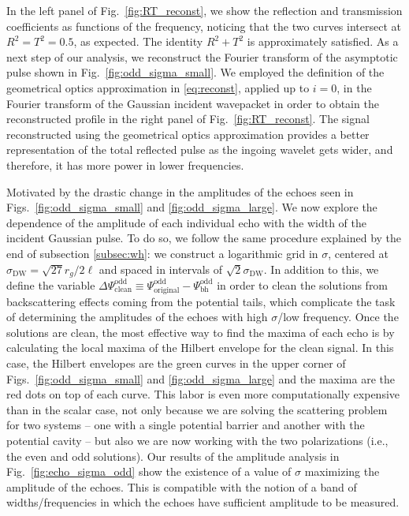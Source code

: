 \documentclass[article,aps,nofootinbib,twocolumn,superscriptaddress]{revtex4-1}
\begin{document}
In the left panel of Fig.~\ref{fig:RT_reconst}, we show the reflection and transmission coefficients as functions of the frequency, noticing that the two curves intersect at $R^2=T^2=0.5$, as expected. The identity $R^2+T^2$ is approximately satisfied. As a next step of our analysis, we reconstruct the Fourier transform of the asymptotic pulse shown in Fig.~\ref{fig:odd_sigma_small}.  We employed the definition of the geometrical optics approximation in \eqref{eq:reconst}, applied up to $i=0$, in the Fourier transform of the Gaussian incident wavepacket in order to obtain the reconstructed profile in the right panel of Fig.~\ref{fig:RT_reconst}. The signal reconstructed using the geometrical optics approximation provides a better representation of the total reflected pulse as the ingoing wavelet gets wider, and therefore, it has more power in lower frequencies. 

Motivated by the drastic change in the amplitudes of the echoes seen in Figs.~\ref{fig:odd_sigma_small} and \ref{fig:odd_sigma_large}. We now explore the dependence of the amplitude of each individual echo with the width of the incident Gaussian pulse. To do so, we follow the same procedure explained by the end of subsection \ref{subsec:wh}: we construct a logarithmic grid in $\sigma$, centered at $\sigma_{\mathrm{DW}}=\sqrt{27}r_g/2\ell$ and spaced in intervals of $\sqrt{2}\sigma_{\mathrm{DW}}$. In addition to this, we define the variable $\Delta\Psi^{\mathrm{odd}}_{\mathrm{clean}}\equiv\Psi^{\mathrm{odd}}_{\mathrm{original}}-\Psi^{\mathrm{odd}}_{\mathrm{bh}}$ in order to clean the solutions from backscattering effects coming from the potential tails, which complicate the task of determining the amplitudes of the echoes with high $\sigma$/low frequency. Once the solutions are clean, the most effective way to find the maxima of each echo is by calculating the local maxima of the Hilbert envelope for the clean signal. In this case, the Hilbert envelopes are the green curves in the upper corner of Figs.~\ref{fig:odd_sigma_small} and \ref{fig:odd_sigma_large} and the maxima are the red dots on top of each curve. 
This labor is even more computationally expensive than in the scalar case, not only because we are solving the scattering problem for two systems -- one with a single potential barrier and another with the potential cavity -- but also we are now working with the two polarizations (i.e., the even and odd solutions). Our results of the amplitude analysis in Fig.~\ref{fig:echo_sigma_odd} show the existence of a value of $\sigma$ maximizing the amplitude of the echoes. This is compatible with the notion of a band of widths/frequencies in which the echoes have sufficient amplitude to be measured.    
\end{document}
